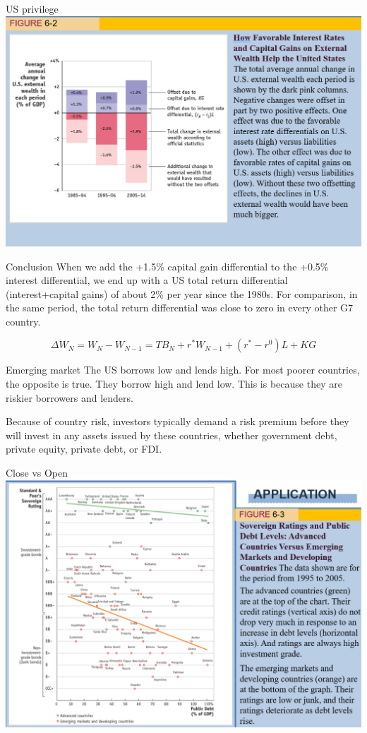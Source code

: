 \documentclass[
  ignorenonframetext,
]{beamer}
\begin{document}
\begin{frame}{US privilege}
\label{us-privilege}
\includegraphics{pic1.png}
\end{frame}

\begin{frame}{Conclusion}
\label{conclusion}
When we add the +1.5\% capital gain differential to the +0.5\% interest
differential, we end up with a US total return differential
(interest+capital gains) of about 2\% per year since the 1980s. For
comparison, in the same period, the total return differential was close
to zero in every other G7 country.

\[
\Delta W_N=W_N-W_{N-1}=TB_N+r^*W_{N-1}+(r^*-r^0)L+KG
\]
\end{frame}

\begin{frame}{Emerging market}
\label{emerging-market}
The US borrows low and lends high. For most poorer countries, the
opposite is true. They borrow high and lend low. This is because they
are riskier borrowers and lenders.

Because of country risk, investors typically demand a risk premium
before they will invest in any assets issued by these countries, whether
government debt, private equity, private debt, or FDI.
\end{frame}

\begin{frame}{Close vs Open}
\label{close-vs-open}
\includegraphics{pic2.png}
\end{frame}
\end{document}
